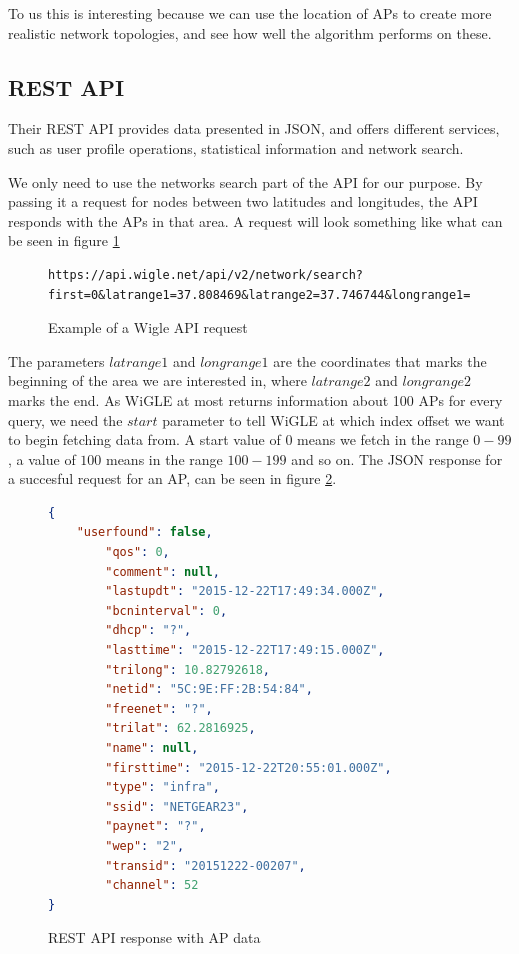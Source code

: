 	To us this is interesting because we can use the location of APs to
	create more realistic network topologies, and see how well the algorithm 
	performs on these. 


	\subsection{REST API}
	Their REST API provides data presented in JSON, and offers different services,
	such as user profile operations, statistical information and network search.

	We only need to use the networks search part of the API for our purpose. 
	By passing it a request for nodes between two latitudes
	and longitudes, the API responds with the APs in that area.  
	A request will look something like what can be seen in figure \ref{fig:wigReq}
	\begin{figure}
	\begin{lstlisting}[breaklines]
	https://api.wigle.net/api/v2/network/search?first=0&latrange1=37.808469&latrange2=37.746744&longrange1=-122.539232&longrange2=-122.381355
	\end{lstlisting}
	\caption{Example of a Wigle API request}
	\label{fig:wigReq}
	\end{figure}
	The parameters $latrange1$ and $longrange1$ are the coordinates that marks the beginning 
	of the area we are interested in, where $latrange2$ and $longrange2$ marks the end. 
	As WiGLE at most returns information about 100 APs for every query, we need the $start$
	parameter to tell WiGLE at which index offset we want to begin fetching data from.
	A start value of $0$ means we fetch in the range $0-99$, a value of $100$ means in the
	range $100-199$ and so on. The JSON response for a succesful request for an AP,
	can be seen in figure \ref{fig:wigle}.

	\begin{figure}

	\begin{lstlisting}[language=json]
{
	"userfound": false,
		"qos": 0,
		"comment": null,
		"lastupdt": "2015-12-22T17:49:34.000Z",
		"bcninterval": 0,
		"dhcp": "?",
		"lasttime": "2015-12-22T17:49:15.000Z",
		"trilong": 10.82792618,
		"netid": "5C:9E:FF:2B:54:84",
		"freenet": "?",
		"trilat": 62.2816925,
		"name": null,
		"firsttime": "2015-12-22T20:55:01.000Z",
		"type": "infra",
		"ssid": "NETGEAR23",
		"paynet": "?",
		"wep": "2",
		"transid": "20151222-00207",
		"channel": 52
}

\end{lstlisting}
\caption{REST API response with AP data}
\label{fig:wigle}
\end{figure}

